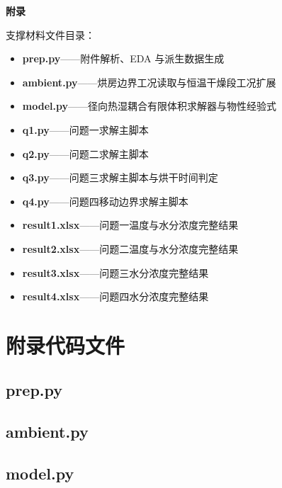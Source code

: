 \documentclass[12pt,a4paper]{article}
\newcommand{\appendixtitlefont}{\fontsize{14pt}{18pt}\selectfont\heiti\bfseries}
\begin{document}
\clearpage
\label{appendix:start}
\begin{appendices}
\begin{center}
{\appendixtitlefont 附录}
\end{center}
\vspace{0.35em}
\par\noindent\hspace{2em}支撑材料文件目录：\par
\begin{itemize}[label={},leftmargin=1.9em,itemsep=0.25em,topsep=0.25em]
    \item \textbf{prep.py}——附件解析、EDA 与派生数据生成
    \item \textbf{ambient.py}——烘房边界工况读取与恒温干燥段工况扩展
    \item \textbf{model.py}——径向热湿耦合有限体积求解器与物性经验式
    \item \textbf{q1.py}——问题一求解主脚本
    \item \textbf{q2.py}——问题二求解主脚本
    \item \textbf{q3.py}——问题三求解主脚本与烘干时间判定
    \item \textbf{q4.py}——问题四移动边界求解主脚本
    \item \textbf{result1.xlsx}——问题一温度与水分浓度完整结果
    \item \textbf{result2.xlsx}——问题二温度与水分浓度完整结果
    \item \textbf{result3.xlsx}——问题三水分浓度完整结果
    \item \textbf{result4.xlsx}——问题四水分浓度完整结果
\end{itemize}
\section{附录代码文件}
\subsection{prep.py}

\subsection{ambient.py}

\subsection{model.py}


\end{appendices}
\end{document}
